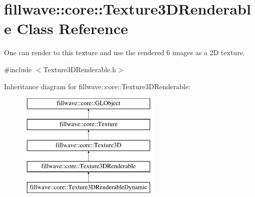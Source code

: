\hypertarget{classfillwave_1_1core_1_1Texture3DRenderable}{}\section{fillwave\+:\+:core\+:\+:Texture3\+D\+Renderable Class Reference}
\label{classfillwave_1_1core_1_1Texture3DRenderable}


One can render to this texture and use the rendered 6 images as a 2\+D texture.  




{\ttfamily \#include $<$Texture3\+D\+Renderable.\+h$>$}

Inheritance diagram for fillwave\+:\+:core\+:\+:Texture3\+D\+Renderable\+:\begin{figure}[H]
\begin{center}
\leavevmode
\includegraphics[height=5.000000cm]{classfillwave_1_1core_1_1Texture3DRenderable}
\end{center}
\end{figure}
